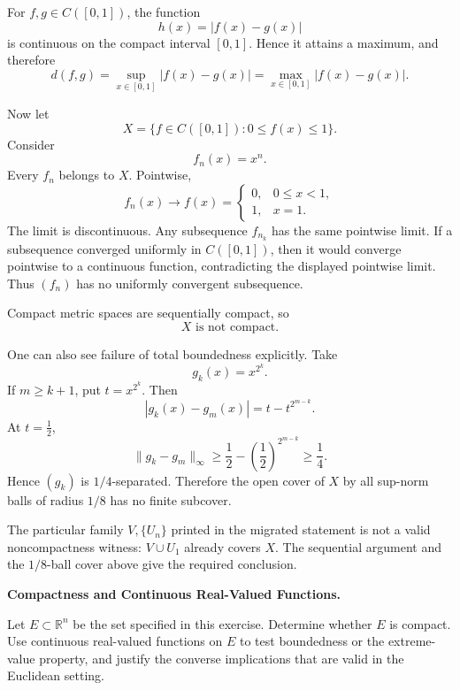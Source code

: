 \begin{solution}
For \(f,g\in C([0,1])\), the function
\[
h(x)=|f(x)-g(x)|
\]
is continuous on the compact interval \([0,1]\). Hence it attains a maximum, and therefore
\[
d(f,g)
=
\sup_{x\in[0,1]}|f(x)-g(x)|
=
\max_{x\in[0,1]}|f(x)-g(x)|.
\]

Now let
\[
X=\{f\in C([0,1]):0\le f(x)\le1\}.
\]
Consider
\[
f_n(x)=x^n.
\]
Every \(f_n\) belongs to \(X\). Pointwise,
\[
f_n(x)\longrightarrow
f(x)=
\begin{cases}
0,&0\le x<1,\\
1,&x=1.
\end{cases}
\]
The limit is discontinuous. Any subsequence \(f_{n_k}\) has the same pointwise limit. If a subsequence converged uniformly in \(C([0,1])\), then it would converge pointwise to a continuous function, contradicting the displayed pointwise limit. Thus \((f_n)\) has no uniformly convergent subsequence.

Compact metric spaces are sequentially compact, so
\[
\boxed{X\text{ is not compact}.}
\]

One can also see failure of total boundedness explicitly. Take
\[
g_k(x)=x^{2^k}.
\]
If \(m\ge k+1\), put \(t=x^{2^k}\). Then
\[
|g_k(x)-g_m(x)|
=
t-t^{2^{m-k}}.
\]
At \(t=\tfrac12\),
\[
\|g_k-g_m\|_\infty
\ge
\frac12-\left(\frac12\right)^{2^{m-k}}
\ge
\frac14.
\]
Hence \((g_k)\) is \(1/4\)-separated. Therefore the open cover of \(X\) by all sup-norm balls of radius \(1/8\) has no finite subcover.

The particular family \(V,\{U_n\}\) printed in the migrated statement is not a valid noncompactness witness: \(V\cup U_1\) already covers \(X\). The sequential argument and the \(1/8\)-ball cover above give the required conclusion.
\end{solution}


\begin{problem}[CP-II-0017]
\label{prob:cp-ii-0017}
\textbf{Compactness and Continuous Real-Valued Functions.}

\hspace*{1.5em}Let \(E\subset\mathbb R^n\) be the set specified in this exercise. Determine
whether \(E\) is compact. Use continuous real-valued functions on \(E\) to
test boundedness or the extreme-value property, and justify the converse
implications that are valid in the Euclidean setting.
\end{problem}

